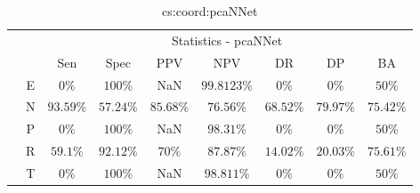 \begin{table}[!ht]
	\centering
	\begin{tabular}{|c|c|c|c|c|c|c|c|c|}
		\cline{3-9}
		\multicolumn{2}{c|}{} & \multicolumn{7}{c|}{Statistics - pcaNNet} \\ \cline{3-9}
		\multicolumn{2}{c|}{} & Sen & Spec & PPV & NPV & DR & DP & BA \\ \hline
		\multirow{5}{*}{\rotatebox{90}{Class}} & E & $0\%$ & $100\%$ & NaN & $99.8123\%$ & $0\%$ & $0\%$ & $50\%$ \\ \cline{2-9}
		 & N & $93.59\%$ & $57.24\%$ & $85.68\%$ & $76.56\%$ & $68.52\%$ & $79.97\%$ & $75.42\%$ \\ \cline{2-9}
		 & P & $0\%$ & $100\%$ & NaN & $98.31\%$ & $0\%$ & $0\%$ & $50\%$ \\ \cline{2-9}
		 & R & $59.1\%$ & $92.12\%$ & $70\%$ & $87.87\%$ & $14.02\%$ & $20.03\%$ & $75.61\%$ \\ \cline{2-9}
		 & T & $0\%$ & $100\%$ & NaN & $98.811\%$ & $0\%$ & $0\%$ & $50\%$ \\ \hline
	\end{tabular}
	\caption{cs:coord:pcaNNet}
	\label{tab:cs:coord:pcaNNet}
\end{table}
